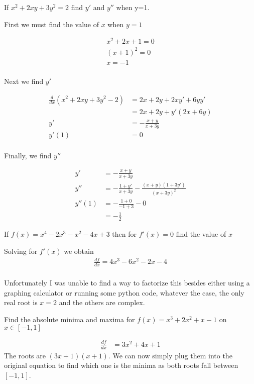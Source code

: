 \documentclass[a4paper]{article}
\begin{document}
\begin{question}
	If \(x^2 + 2xy + 3y^2 = 2\) find \(y'\) and \(y''\) when y=1.
\end{question}

First we must find the value of \(x\) when \(y=1\)

\begin{align*}
	x^2 + 2x + 1 = 0 \\
	(x+1)^2 = 0 \\
	x = -1 \\
\end{align*}

Next we find \(y'\)

\begin{align*}
	\frac{d}{dx} (x^2 +2xy + 3y^2 - 2) &= 2x +2y + 2xy' + 6yy' \\
	&= 2x + 2y + y'(2x+6y) \\
	y' &= -\frac{x+y}{x+3y} \\
	y'(1) &= 0 \\
\end{align*}

Finally, we find \(y''\)

\begin{align*}
	y' &= -\frac{x+y}{x+3y} \\
	y'' &= -\frac{1+y'}{x+3y} - \frac{(x+y)(1+3y')}{(x+3y)^2} \\
	y''(1) &= -\frac{1+0}{-1+3} - 0 \\
	 &= -\frac{1}{2}
\end{align*}

\begin{question}
	If \(f(x) = x^4 -2x^3- x^2 -4x +3\) then for \(f'(x) = 0\) find the value of \(x\)
\end{question}

Solving for \(f'(x)\) we obtain
\begin{align*}
	\frac{df}{dx} = 4x^3 - 6x^2 - 2x -4 \\
\end{align*}

Unfortunately I was unable to find a way to factorize this besides either using a graphing calculator or running some python code, whatever the case, the only real root is \(x=2\) and the others are complex.

\begin{question}
	Find the absolute minima and maxima for \(f(x) = x^3 +2x^2 +x -1\) on \(x \in [-1, 1]\)
\end{question}

\begin{align*}
	\frac{df}{dx} &= 3x^2 +4x +1
\end{align*}
The roots are \((3x+1)(x+1)\). We can now simply plug them into the original equation to find which one is the minima as both roots fall between \([-1,1]\).
\end{document}
